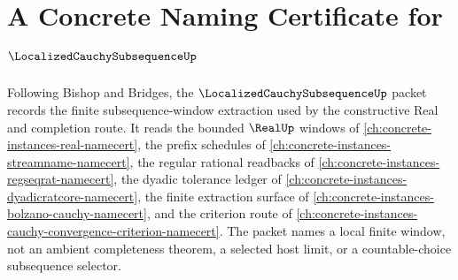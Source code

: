 \chapter{A Concrete Naming Certificate for $\LocalizedCauchySubsequenceUp$}
\label{ch:concrete-instances-localized-cauchy-subsequence-namecert}

Following Bishop and Bridges, the $\LocalizedCauchySubsequenceUp$ packet records the finite subsequence-window extraction used by the constructive Real and completion route. It reads the bounded $\RealUp$ windows of \autoref{ch:concrete-instances-real-namecert}, the prefix schedules of \autoref{ch:concrete-instances-streamname-namecert}, the regular rational readbacks of \autoref{ch:concrete-instances-regseqrat-namecert}, the dyadic tolerance ledger of \autoref{ch:concrete-instances-dyadicratcore-namecert}, the finite extraction surface of \autoref{ch:concrete-instances-bolzano-cauchy-namecert}, and the criterion route of \autoref{ch:concrete-instances-cauchy-convergence-criterion-namecert}. The packet names a local finite window, not an ambient completeness theorem, a selected host limit, or a countable-choice subsequence selector.

